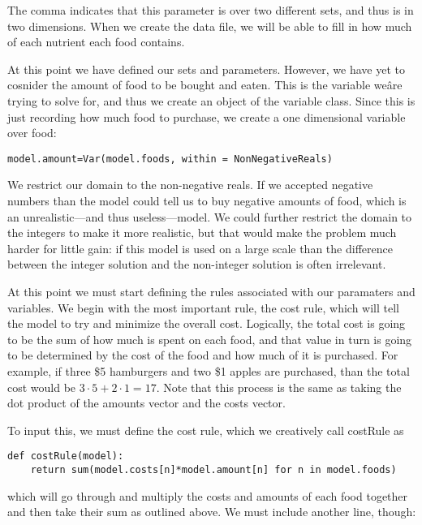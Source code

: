 \documentclass{article}
\begin{document}
The comma indicates that this parameter is over two different sets, and thus is in two dimensions.  When we create the data file, we will be able to fill in how much of each nutrient each food contains.

At this point we have defined our sets and parameters.  However, we have yet to cosnider the amount of food to be bought and eaten.  This is the variable weâre trying to solve for, and thus we create an object of the variable class.  Since this is just recording how much food to purchase, we create a one dimensional variable over food:

\begin{verbatim}model.amount=Var(model.foods, within = NonNegativeReals) \end{verbatim}

We restrict our domain to the non-negative reals.  If we accepted negative numbers than the model could tell us to buy negative amounts of food, which is an unrealistic---and thus useless---model.  We could further restrict the domain to the integers to make it more realistic, but that would make the problem much harder for little gain: if this model is used on a large scale than the difference between the integer solution and the non-integer solution is often irrelevant.

At this point we must start defining the rules associated with our paramaters and variables.  We begin with the most important rule, the cost rule, which will tell the model to try and minimize the overall cost.  Logically, the total cost is going to be the sum of how much is spent on each food, and that value in turn is going to be determined by the cost of the food and how much of it is purchased.  For example, if three \$5 hamburgers and two \$1 apples are purchased, than the total cost would be $3 \cdot 5 + 2 \cdot 1 = 17$.  Note that this process is the same as taking the dot product of the amounts vector and the costs vector.

To input this, we must define the cost rule, which we creatively call costRule as 

\begin{verbatim}def costRule(model):
    return sum(model.costs[n]*model.amount[n] for n in model.foods)
\end{verbatim}

\noindent
which will go through and multiply the costs and amounts of each food together and then take their sum as outlined above.  We must include another line, though:
\end{document}
